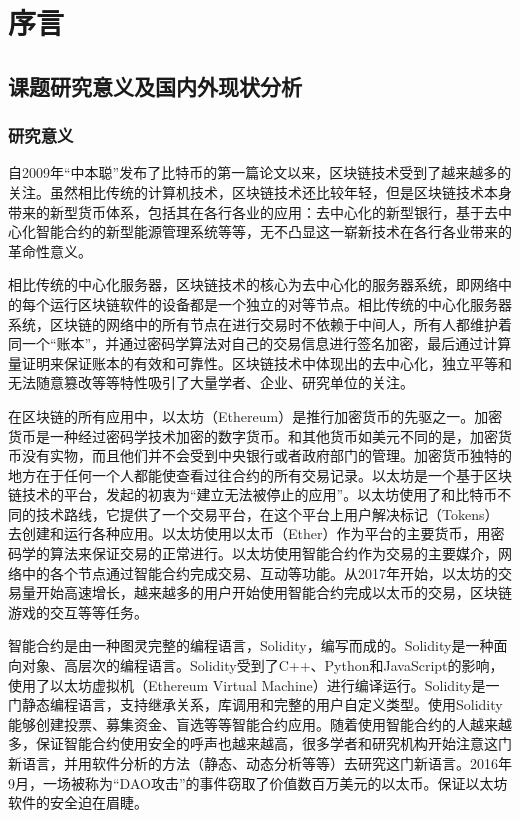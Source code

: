 
\chapter{序言}

\section{课题研究意义及国内外现状分析}

\subsection{研究意义}
自2009年“中本聪”发布了比特币的第一篇论文以来，区块链技术受到了越来越多的关注。虽然相比传统的计算机技术，区块链技术还比较年轻，但是区块链技术本身带来的新型货币体系，包括其在各行各业的应用：去中心化的新型银行\cite{blockchain-application}，基于去中心化智能合约的新型能源管理系统\cite{blockchain-in-energy}等等，无不凸显这一崭新技术在各行各业带来的革命性意义。

相比传统的中心化服务器，区块链技术的核心为去中心化的服务器系统，即网络中的每个运行区块链软件的设备都是一个独立的对等节点\cite{区块链技术及其应用研究}。相比传统的中心化服务器系统，区块链的网络中的所有节点在进行交易时不依赖于中间人，所有人都维护着同一个“账本”，并通过密码学算法对自己的交易信息进行签名加密，最后通过计算量证明来保证账本的有效和可靠性。区块链技术中体现出的去中心化，独立平等和无法随意篡改等等特性吸引了大量学者、企业、研究单位的关注。

在区块链的所有应用中，以太坊（Ethereum）是推行加密货币的先驱之一。加密货币是一种经过密码学技术加密的数字货币。和其他货币如美元不同的是，加密货币没有实物，而且他们并不会受到中央银行或者政府部门的管理。加密货币独特的地方在于任何一个人都能使查看过往合约的所有交易记录。以太坊是一个基于区块链技术的平台，发起的初衷为“建立无法被停止的应用”\cite{eth-intro}。以太坊使用了和比特币不同的技术路线，它提供了一个交易平台，在这个平台上用户解决标记（Tokens）去创建和运行各种应用。以太坊使用以太币（Ether）作为平台的主要货币，用密码学的算法来保证交易的正常进行。以太坊使用智能合约作为交易的主要媒介，网络中的各个节点通过智能合约完成交易、互动等功能。从2017年开始，以太坊的交易量开始高速增长\cite{eth-chart}，越来越多的用户开始使用智能合约完成以太币的交易，区块链游戏的交互等等任务。

智能合约是由一种图灵完整的编程语言，Solidity，编写而成的。Solidity是一种面向对象、高层次的编程语言。Solidity受到了C++、Python和JavaScript的影响，使用了以太坊虚拟机（Ethereum Virtual Machine）进行编译运行。Solidity是一门静态编程语言，支持继承关系，库调用和完整的用户自定义类型。使用Solidity能够创建投票、募集资金、盲选等等智能合约应用。随着使用智能合约的人越来越多，保证智能合约使用安全的呼声也越来越高，很多学者和研究机构开始注意这门新语言，并用软件分析的方法（静态、动态分析等等）去研究这门新语言。2016年9月，一场被称为“DAO攻击”的事件窃取了价值数百万美元的以太币\cite{dao-attack}。保证以太坊软件的安全迫在眉睫。

